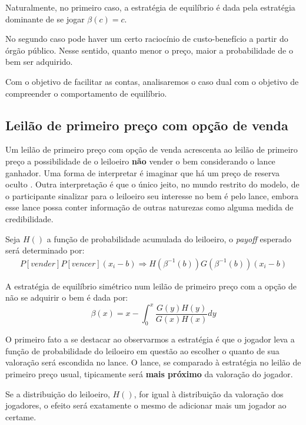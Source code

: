 Naturalmente, no primeiro caso, a estratégia de equilíbrio é dada pela estratégia dominante de se jogar $\beta(c) = c$.

No segundo caso pode haver um certo raciocínio de custo-benefício a partir do órgão público. Nesse sentido, quanto menor o preço, maior a probabilidade de o bem ser adquirido.

Com o objetivo de facilitar as contas, analisaremos o caso dual com o objetivo de compreender o comportamento de equilíbrio.

\subsection{Leilão de primeiro preço com opção de venda}

Um leilão de primeiro preço com opção de venda acrescenta ao leilão de primeiro preço a possibilidade de o leiloeiro \textbf{não} vender o bem considerando o lance ganhador. Uma forma de interpretar é imaginar que há um preço de reserva oculto \citet{Bugarin2022}. Outra interpretação é que o único jeito, no mundo restrito do modelo, de o participante sinalizar para o leiloeiro seu interesse no bem é pelo lance, embora esse lance possa conter informação de outras naturezas como alguma medida de credibilidade.

Seja $H()$ a função de probabilidade acumulada do leiloeiro, o \emph{payoff} esperado será determinado por:
\begin{align*}
	P[vender]P[vencer](x_i - b) \Rightarrow H(\beta^{-1}(b))G(\beta^{-1}(b))(x_i - b)
\end{align*}

\begin{proposicao}
	\label{prop:nash-primeiro-preco-opcao}
	A estratégia de equilíbrio simétrico num leilão de primeiro preço com a opção de não se adquirir o bem é dada por:
	\begin{equation}
		\beta(x) = x - \int_0^x \frac{G(y)H(y)}{G(x)H(x)}dy
	\end{equation}
\end{proposicao}

O primeiro fato a se destacar ao observarmos a estratégia é que o jogador leva a função de probabilidade do leiloeiro em questão ao escolher o quanto de sua valoração será escondida no lance. O lance, se comparado à estratégia no leilão de primeiro preço usual, tipicamente será \textbf{mais próximo} da valoração do jogador.

Se a distribuição do leiloeiro, $H()$, for igual à distribuição da valoração dos jogadores, o efeito será exatamente o mesmo de adicionar mais um jogador ao certame. 

